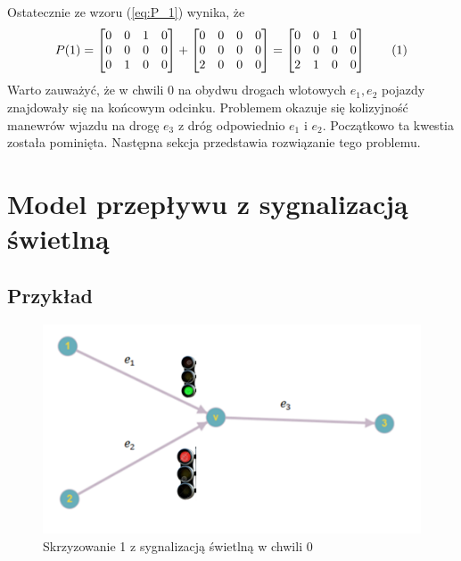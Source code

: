 \documentclass[12pt]{book}
\theoremstyle{plain}
\newcommand\addtag{\refstepcounter{equation}
\renewcommand{\labelenumii}{\theenumii}
\renewcommand{\theenumii}{\theenumi.\arabic{enumii}.}
\tag{\theequation}}
\begin{document}
Ostatecznie ze wzoru (\ref{eq:P_1}) wynika, że
 \[P(1)=\begin{bmatrix}
 0 & 0 & 1 & 0\\
 0 & 0 & 0 & 0\\
 0 & 1 & 0 & 0\\
 \end{bmatrix}+
 \begin{bmatrix}
 0 & 0 & 0 & 0\\
 0 & 0 & 0 & 0\\
 2 & 0 & 0 & 0\\
 \end{bmatrix}=
  \begin{bmatrix}
 0 & 0 & 1 & 0\\
 0 & 0 & 0 & 0\\
 2 & 1 & 0 & 0\\
 \end{bmatrix} \addtag
 \]
Warto zauważyć, że w chwili 0 na obydwu drogach wlotowych $e_1,e_2$ pojazdy znajdowały się na końcowym odcinku. Problemem okazuje się kolizyjność manewrów wjazdu na drogę $e_3$ z dróg odpowiednio $e_1$ i $e_2$. Początkowo ta kwestia została pominięta. Następna sekcja przedstawia rozwiązanie tego problemu.
\section{Model przepływu z sygnalizacją świetlną}
\subsection{Przykład}
\begin{figure}[H]
  \centering
    \includegraphics[width=14cm]{skrz_2_sygnalizacja}
 \caption{Skrzyzowanie 1 z sygnalizacją świetlną w chwili 0}
 \label{fig:skrz_1_sygnalizacja}
\end{figure}
\end{document}
